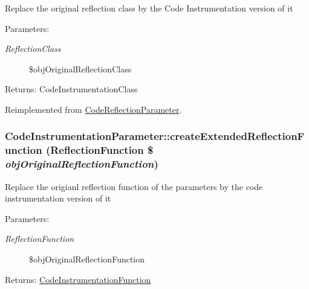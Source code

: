 Replace the original reflection class by the Code Instrumentation version of it

\begin{Desc}
\item[Parameters:]
\begin{description}
\item[{\em ReflectionClass}]\$objOriginalReflectionClass \end{description}
\end{Desc}
\begin{Desc}
\item[Returns:]CodeInstrumentationClass \end{Desc}


Reimplemented from \hyperlink{class_code_reflection_parameter_a2b9b21f9711afbf11791dd64dcbdd0a}{CodeReflectionParameter}.\hypertarget{class_code_instrumentation_parameter_e9723a389b48bdb31fc49f784692aecf}{
\subsubsection[{createExtendedReflectionFunction}]{\setlength{\rightskip}{0pt plus 5cm}CodeInstrumentationParameter::createExtendedReflectionFunction (ReflectionFunction \$ {\em objOriginalReflectionFunction})}}
\label{class_code_instrumentation_parameter_e9723a389b48bdb31fc49f784692aecf}


Replace the origianl reflection function of the parameters by the code instrumentation version of it

\begin{Desc}
\item[Parameters:]
\begin{description}
\item[{\em ReflectionFunction}]\$objOriginalReflectionFunction \end{description}
\end{Desc}
\begin{Desc}
\item[Returns:]\hyperlink{class_code_instrumentation_function}{CodeInstrumentationFunction} \end{Desc}


